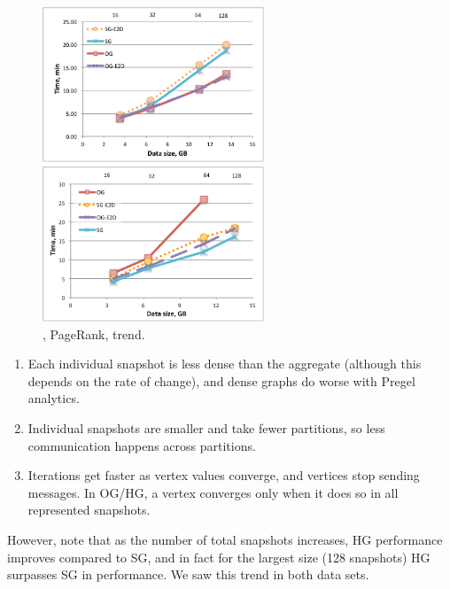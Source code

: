 \begin{figure}[t!]
\centering
\begin{minipage}{3in}
  \centering
  \includegraphics[width=2.6in]{figs/trend_degrees.pdf}
  \vspace{-0.1in}
  \caption{.}
  \label{fig:trend_deg}
  \vspace{-0.5cm}
\end{minipage}
\begin{minipage}{3in}
  \centering
\includegraphics[width=2.6in]{figs/complexq.pdf}
  \vspace{-0.1in}
\caption{, PageRank, trend.}
\label{fig:complexq}
  \vspace{-0.5cm}
\end{minipage}
\end{figure}

\begin{enumerate}[leftmargin=*]
\item Each individual snapshot is less dense than the aggregate
  (although this depends on the rate of change), and dense graphs do
  worse with Pregel analytics.
\item Individual snapshots are smaller and take fewer partitions, so
  less communication happens across partitions.
\item Iterations get faster as vertex values converge, and vertices
  stop sending messages.  In OG/HG, a vertex converges only when it
  does so in all represented snapshots.
\end{enumerate}

However, note that as the number of total snapshots increases, HG
performance improves compared to SG, and in fact for the largest size
(128 snapshots) HG surpasses SG in performance.  We saw this trend in
both data sets.

